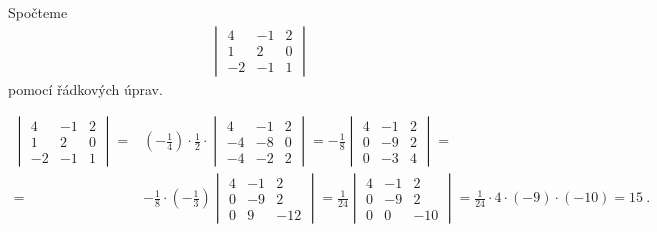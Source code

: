 \begin{example}
    Spočteme \begin{align}
        \begin{vmatrix}
            4 & -1 & 2 \\ 1 & 2 & 0 \\ -2 & -1 & 1
        \end{vmatrix}
    \end{align}
    pomocí řádkových úprav.

    \begin{align}
        \begin{vmatrix}
            4 & -1 & 2 \\ 1 & 2 & 0 \\ -2 & -1 & 1
        \end{vmatrix}
        =&
        \left( - \frac{1}{4} \right) \cdot \frac{1}{2} \cdot \begin{vmatrix}
            4 & -1 & 2 \\ -4 & -8 & 0 \\ -4 & -2 & 2
        \end{vmatrix}
        =
        - \frac{1}{8} \begin{vmatrix}
            4 & -1 & 2 \\ 0 & -9 & 2 \\ 0 & -3 & 4
        \end{vmatrix}
        = \\ =&
        - \frac{1}{8} \cdot \left( -\frac{1}{3}\right) \begin{vmatrix}
            4 & -1 & 2 \\ 0 & -9 & 2 \\ 0 & 9 & -12
        \end{vmatrix}
        =
        \frac{1}{24}
        \begin{vmatrix}
            4 & -1 & 2 \\ 0 & -9 & 2 \\ 0 & 0 & -10
        \end{vmatrix}
        = \frac{1}{24} \cdot 4 \cdot (-9) \cdot (-10) = 15 \:.
    \end{align}
\end{example}